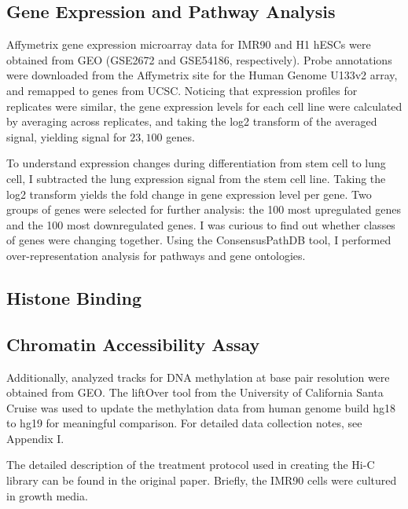 
\subsection*{Gene Expression and Pathway Analysis}

Affymetrix gene expression microarray data for IMR90 and H1 hESCs were obtained from GEO (GSE2672\cite{kim2005}
and GSE54186\cite{kim2014}, respectively).  Probe annotations were downloaded from the Affymetrix site for
the Human Genome U133v2 array, and remapped to genes from UCSC\@.  Noticing that expression profiles for replicates
were similar, the gene expression levels for each cell line were calculated by averaging across replicates, and
taking the log2 transform of the averaged signal, yielding signal for $23,100$ genes.


To understand expression changes during differentiation from stem cell to lung cell, I subtracted the lung expression
signal from the stem cell line.  Taking the log2 transform yields the fold change in gene expression level per gene.
Two groups of genes were selected for further analysis: the 100 most upregulated genes and the 100 most downregulated
genes.  I was curious to find out whether classes of genes were changing together.  Using the ConsensusPathDB
tool\cite{kamburov2012}, I performed over-representation analysis for pathways and gene ontologies.

\subsection*{Histone Binding}


\subsection*{Chromatin Accessibility Assay}


Additionally, analyzed tracks for DNA methylation at base pair
resolution were obtained from GEO\cite{lister2009}.  The liftOver tool from
the University of California Santa Cruise was used to update the methylation
data from human genome build hg18 to hg19 for meaningful comparison\cite{hinrichs2006}.
For detailed data collection notes, see Appendix I.

The detailed description of the treatment protocol used in creating the Hi-C
library can be found in the original paper\cite{ren2013}.  Briefly, the IMR90
cells were cultured in growth media.

